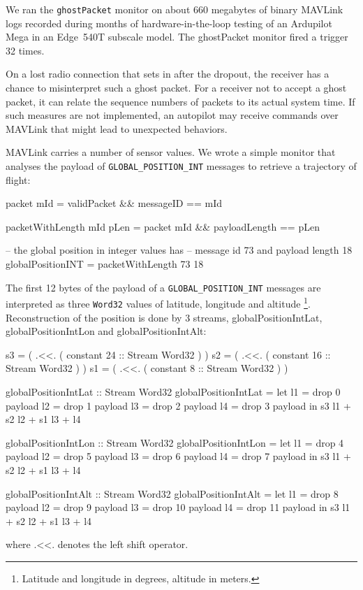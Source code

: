 We ran the {\tt ghostPacket} monitor on about 660 megabytes of
binary MAVLink logs recorded during months of hardware-in-the-loop
testing of an Ardupilot Mega in an Edge~540T subscale model. %
The ghostPacket monitor fired a trigger 32 times.  

On a lost radio connection that sets in after the dropout, the receiver has a
chance to misinterpret such a ghost packet.  For a receiver not to accept a
ghost packet, it can relate the sequence numbers of packets to its actual system
time. If such measures are not implemented, an autopilot may receive commands
over MAVLink that might lead to unexpected behaviors.

MAVLink carries a number of sensor values. We wrote a simple monitor that
analyses the payload of {\tt GLOBAL\_POSITION\_INT} messages to retrieve a
trajectory of flight:

\begin{code}
packet mId = validPacket && messageID == mId

packetWithLength mId pLen = packet mId
                          && payloadLength == pLen

-- the global position in integer values has 
-- message id 73  and payload length 18
globalPositionINT = packetWithLength 73 18
\end{code}

The first 12 bytes of the payload of a {\small \tt GLOBAL\_POSITION\_INT}
messages are interpreted as three {\tt Word32} values of latitude, longitude and
altitude
\footnote{Latitude and longitude in degrees, altitude in meters.}.
Reconstruction of the position is done by 3 streams, globalPositionIntLat,
globalPositionIntLon and globalPositionIntAlt:

\begin{code}
s3 = ( .<<. ( constant 24 :: Stream Word32 ) )
s2 = ( .<<. ( constant 16 :: Stream Word32 ) )
s1 = ( .<<. ( constant 8  :: Stream Word32 ) )

globalPositionIntLat :: Stream Word32
globalPositionIntLat = let l1 = drop 0 payload
                           l2 = drop 1 payload
                           l3 = drop 2 payload
                           l4 = drop 3 payload
                       in s3 l1 + s2 l2 + s1 l3 + l4

globalPositionIntLon :: Stream Word32
globalPositionIntLon = let l1 = drop 4 payload
                           l2 = drop 5 payload
                           l3 = drop 6 payload
                           l4 = drop 7 payload
                       in s3 l1 + s2 l2 + s1 l3 + l4

globalPositionIntAlt :: Stream Word32
globalPositionIntAlt = let l1 = drop 8  payload
                           l2 = drop 9  payload
                           l3 = drop 10 payload
                           l4 = drop 11 payload
                       in s3 l1 + s2 l2 + s1 l3 + l4
\end{code}
where $\texttt{.<<.}$ denotes the left shift operator. 

